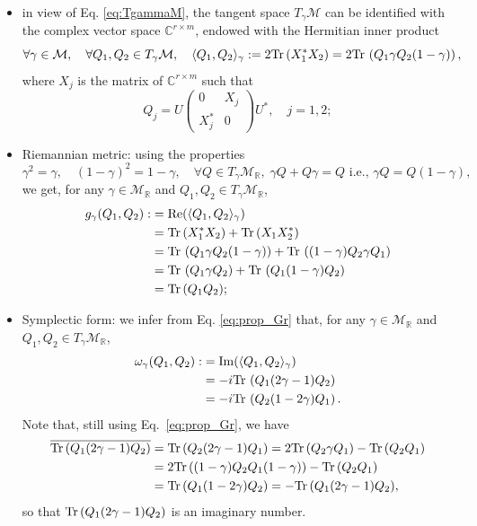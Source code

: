 \documentclass[11pt]{article}
\def\tr{{\rm Tr \,}}
\def\R{{\mathbb R}}
\def\C{{\mathbb C}}
\begin{document}
\begin{itemize}
\item in view of Eq. \eqref{eq:TgammaM}, the tangent space $T_\gamma\mathcal M$ can be identified with the complex vector space $\C^{r \times m}$, endowed with the Hermitian inner product
$$
\forall \gamma \in \mathcal M, \quad \forall Q_1,Q_2 \in T_\gamma\mathcal M, \quad 
\langle Q_1,Q_2 \rangle_\gamma:= 2 \tr(X_1^*X_2) = 2 \tr\left( Q_1 \gamma Q_2 (1-\gamma) \right),
$$
where $X_j$ is the matrix of $\C^{r \times m}$ such that
\begin{equation} \label{eq:Grassmann_diag}
Q_j =  U \left( \begin{array}{cc} 0 & X_j \\ X_j^* & 0 \end{array} \right) U^*,\quad j=1,2;
\end{equation}
\item Riemannian metric: using the properties 
\begin{equation} \label{eq:prop_Gr}
    \gamma^2=\gamma, \quad (1-\gamma)^2=1-\gamma, \quad \forall Q \in T_\gamma\mathcal M_\R, \; \gamma Q+Q\gamma=Q  \mbox{ i.e., } \gamma Q = Q (1-\gamma),
\end{equation}
we get, for any $\gamma\in\mathcal{M}_{\R}$ and $Q_1,Q_2\in T_\gamma\mathcal{M}_{\R}$,
\begin{align*}
g_\gamma(Q_1,Q_2):&= {\rm Re}(\langle Q_1,Q_2 \rangle_\gamma) \\
&= \tr(X_1^*X_2)+\tr(X_1X_2^*) \\
&=  \tr\left( Q_1 \gamma Q_2 (1-\gamma) \right) +  \tr\left(  (1-\gamma) Q_2 \gamma Q_ 1 \right) \\
&= \tr\left( Q_1 \gamma Q_2 \right)+  \tr\left(  Q_1 (1-\gamma) Q_2 \right) \\
&= \tr(Q_1Q_2);
\end{align*}
\item Symplectic form: we infer from Eq. \eqref{eq:prop_Gr} that, for any $\gamma\in\mathcal{M}_{\R}$ and $Q_1,Q_2\in T_\gamma\mathcal{M}_{\R}$,
\begin{align*}
\omega_\gamma(Q_1,Q_2):&= {\rm Im}(\langle Q_1,Q_2 \rangle_\gamma) \\
&=  - i  \tr\left( Q_1 (2\gamma-1) Q_2 \right) \\ & = - i  \tr\left( Q_2 (1-2\gamma) Q_1 \right) .
\end{align*}
Note that, still using Eq.~\eqref{eq:prop_Gr}, we have
\begin{align*}
\overline{\tr(Q_1(2\gamma-1)Q_2)}&= \tr(Q_2(2\gamma-1)Q_1)= 2\tr(Q_2\gamma Q_1)-\tr(Q_2Q_1)\\
&=2\tr((1-\gamma)Q_2Q_1(1-\gamma))-\tr(Q_2Q_1) \\ 
&= \tr(Q_1(1-2\gamma)Q_2)= - \tr(Q_1(2\gamma-1)Q_2),
\end{align*}
so that $\tr(Q_1(2\gamma-1)Q_2)$ is an imaginary number.
\end{itemize}
\end{document}
